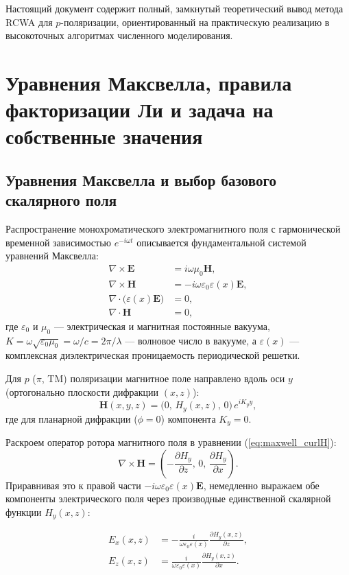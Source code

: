 \documentclass[a4paper,11pt]{article}
\begin{document}
Настоящий документ содержит полный, замкнутый теоретический вывод метода RCWA для $p$-поляризации, ориентированный на практическую реализацию в высокоточных алгоритмах численного моделирования.

\newpage
\section{Уравнения Максвелла, правила факторизации Ли и задача на собственные значения}

\subsection{Уравнения Максвелла и выбор базового скалярного поля}

Распространение монохроматического электромагнитного поля с гармонической временной зависимостью $e^{-i\omega t}$ описывается фундаментальной системой уравнений Максвелла:
\begin{align}
    \nabla \times \mathbf{E} &= i \omega \mu_0 \mathbf{H}, \label{eq:maxwell_curlE} \\
    \nabla \times \mathbf{H} &= -i \omega \varepsilon_0 \varepsilon(x) \mathbf{E}, \label{eq:maxwell_curlH} \\
    \nabla \cdot \big(\varepsilon(x) \mathbf{E}\big) &= 0, \label{eq:maxwell_divD} \\
    \nabla \cdot \mathbf{H} &= 0, \label{eq:maxwell_divB}
\end{align}
где $\varepsilon_0$ и $\mu_0$ — электрическая и магнитная постоянные вакуума, $K = \omega\sqrt{\varepsilon_0\mu_0} = \omega/c = 2\pi/\lambda$ — волновое число в вакууме, а $\varepsilon(x)$ — комплексная диэлектрическая проницаемость периодической решетки.

Для $p$ ($\pi$, TM) поляризации магнитное поле направлено вдоль оси $y$ (ортогонально плоскости дифракции $(x, z)$):
\begin{equation}
    \mathbf{H}(x, y, z) = \big(0, \, H_y(x, z), \, 0\big) \, e^{i K_y y},
\end{equation}
где для планарной дифракции ($\phi = 0$) компонента $K_y = 0$.

Раскроем оператор ротора магнитного поля в уравнении (\ref{eq:maxwell_curlH}):
\begin{equation}
    \nabla \times \mathbf{H} = \left( -\frac{\partial H_y}{\partial z}, \, 0, \, \frac{\partial H_y}{\partial x} \right).
\end{equation}
Приравнивая это к правой части $-i \omega \varepsilon_0 \varepsilon(x) \mathbf{E}$, немедленно выражаем обе компоненты электрического поля через производные единственной скалярной функции $H_y(x, z)$:
\begin{mathbox}
\begin{align}
    E_x(x, z) &= -\frac{i}{\omega \varepsilon_0 \varepsilon(x)} \frac{\partial H_y(x, z)}{\partial z}, \label{eq:Ex_from_Hy} \\[0.5em]
    E_z(x, z) &= \frac{i}{\omega \varepsilon_0 \varepsilon(x)} \frac{\partial H_y(x, z)}{\partial x}. \label{eq:Ez_from_Hy}
\end{align}
\end{mathbox}
\end{document}
